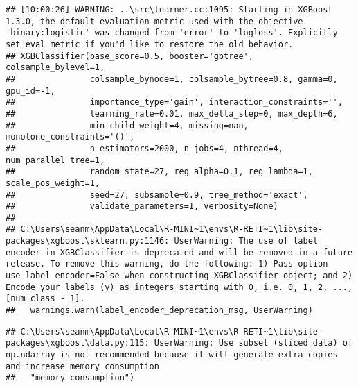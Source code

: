 \documentclass[
  english,
  man]{article}
\begin{document}
\begin{verbatim}
## [10:00:26] WARNING: ..\src\learner.cc:1095: Starting in XGBoost 1.3.0, the default evaluation metric used with the objective 'binary:logistic' was changed from 'error' to 'logloss'. Explicitly set eval_metric if you'd like to restore the old behavior.
## XGBClassifier(base_score=0.5, booster='gbtree', colsample_bylevel=1,
##               colsample_bynode=1, colsample_bytree=0.8, gamma=0, gpu_id=-1,
##               importance_type='gain', interaction_constraints='',
##               learning_rate=0.01, max_delta_step=0, max_depth=6,
##               min_child_weight=4, missing=nan, monotone_constraints='()',
##               n_estimators=2000, n_jobs=4, nthread=4, num_parallel_tree=1,
##               random_state=27, reg_alpha=0.1, reg_lambda=1, scale_pos_weight=1,
##               seed=27, subsample=0.9, tree_method='exact',
##               validate_parameters=1, verbosity=None)
## 
## C:\Users\seanm\AppData\Local\R-MINI~1\envs\R-RETI~1\lib\site-packages\xgboost\sklearn.py:1146: UserWarning: The use of label encoder in XGBClassifier is deprecated and will be removed in a future release. To remove this warning, do the following: 1) Pass option use_label_encoder=False when constructing XGBClassifier object; and 2) Encode your labels (y) as integers starting with 0, i.e. 0, 1, 2, ..., [num_class - 1].
##   warnings.warn(label_encoder_deprecation_msg, UserWarning)
\end{verbatim}

\begin{verbatim}
## C:\Users\seanm\AppData\Local\R-MINI~1\envs\R-RETI~1\lib\site-packages\xgboost\data.py:115: UserWarning: Use subset (sliced data) of np.ndarray is not recommended because it will generate extra copies and increase memory consumption
##   "memory consumption")
\end{verbatim}
\end{document}
